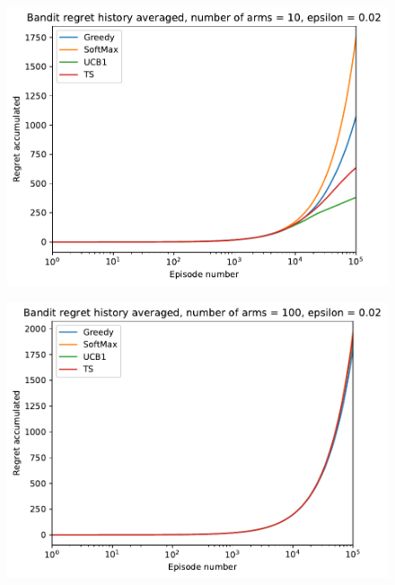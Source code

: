 \documentclass[11pt]{article}
\begin{document}
\begin{figure}[h!]%
  	\includegraphics{regrets_10_002.pdf}
  	\centering
\end{figure}

\begin{figure}[h!]
    \includegraphics{regrets_100_002.pdf}
    \centering
\end{figure}
\end{document}
